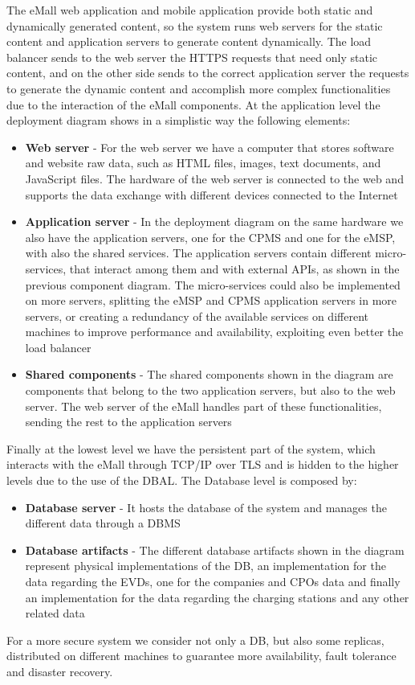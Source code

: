 The eMall web application and mobile application provide both static and dynamically generated content, so the system runs web servers for the static content and application servers to generate content dynamically. The load balancer sends to the web server the HTTPS requests that need only static content, and on the other side sends to the correct application server the requests to generate the dynamic content and accomplish more complex functionalities due to the interaction of the eMall components. 
At the application level the deployment diagram shows in a simplistic way the following elements:
\begin{itemize}
    \item \textbf{Web server} - For the web server we have a computer that stores software and website raw data, such as HTML files, images, text documents, and JavaScript files. The hardware of the web server is connected to the web and supports the data exchange with different devices connected to the Internet
    \item \textbf{Application server} - In the deployment diagram on the same hardware we also have the application servers, one for the CPMS and one for the eMSP, with also the shared services. The application servers contain different micro-services, that interact among them and with external APIs, as shown in the previous component diagram. The micro-services could also be implemented on more servers, splitting the eMSP and CPMS application servers in more servers, or creating a redundancy of the available services on different machines to improve performance and availability, exploiting even better the load balancer
    \item \textbf{Shared components} - The shared components shown in the diagram are components that belong to the two application servers, but also to the web server. The web server of the eMall handles part of these functionalities, sending the rest to the application servers  
\end{itemize}

Finally at the lowest level we have the persistent part of the system, which interacts with the eMall through TCP/IP over TLS and is hidden to the higher levels due to the use of the DBAL. The Database level is composed by:
\begin{itemize}
    \item \textbf{Database server} - It hosts the database of the system and manages the different data through a DBMS 
    \item \textbf{Database artifacts} - The different database artifacts shown in the diagram represent physical implementations of the DB, an implementation for the data regarding the EVDs, one for the companies and CPOs data and finally an implementation for the data regarding the charging stations and any other related data
\end{itemize}
For a more secure system we consider not only a DB, but also some replicas, distributed on different machines to guarantee more availability, fault tolerance and disaster recovery. 

